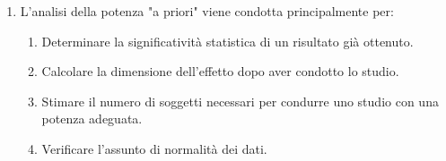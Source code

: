 \documentclass[12pt, a4paper]{article}
\begin{document}
\begin{enumerate}[resume]
    \item L'analisi della potenza "a priori" viene condotta principalmente per:
    \begin{enumerate}
        \item Determinare la significatività statistica di un risultato già ottenuto.
        \item Calcolare la dimensione dell'effetto dopo aver condotto lo studio.
        \item Stimare il numero di soggetti necessari per condurre uno studio con una potenza adeguata.
        \item Verificare l'assunto di normalità dei dati.
    \end{enumerate}
    \vspace{0.3cm}
\end{enumerate}

\end{document}
